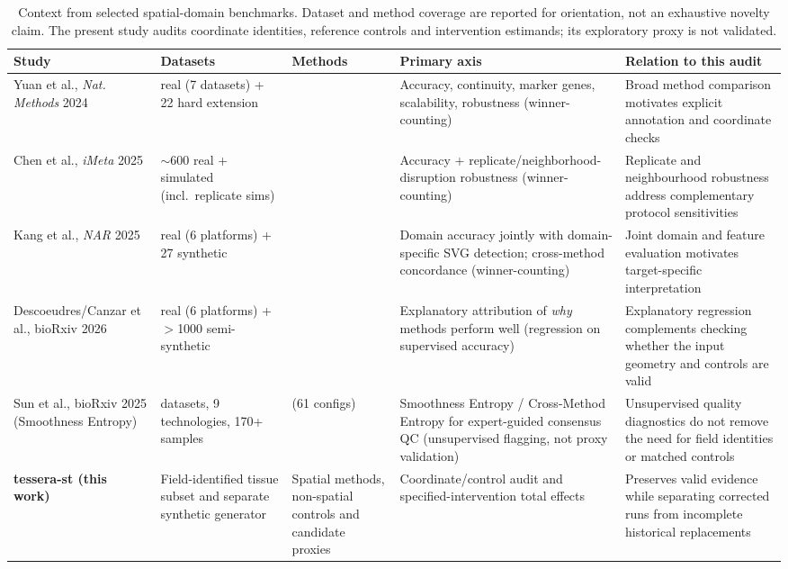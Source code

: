 \documentclass[journal]{IEEEtran}
\begin{document}
\begin{table}[!t]
\centering
\caption{Context from selected spatial-domain benchmarks. Dataset and method coverage are reported for orientation, not an exhaustive novelty claim. The present study audits coordinate identities, reference controls and intervention estimands; its exploratory proxy is not validated.}

\small
\begin{tabular}{@{}>{\raggedright\arraybackslash}p{2.6cm}>{\raggedright\arraybackslash}p{2.7cm}>{\raggedright\arraybackslash}p{2.5cm}>{\raggedright\arraybackslash}p{3.9cm}>{\raggedright\arraybackslash}p{3.3cm}@{}}
\toprule
Study & Datasets & Methods & Primary axis & Relation to this audit \\
\midrule
Yuan et al., \textit{Nat. Methods} 2024 \citep{yuan2024benchmark} &
34 real (7 datasets) + 22 hard extension &
13 &
Accuracy, continuity, marker genes, scalability, robustness (winner-counting) &
Broad method comparison motivates explicit annotation and coordinate checks \\
\addlinespace
Chen et al., \textit{iMeta} 2025 \citep{chen2025imeta} &
$\sim$600 real + simulated (incl.\ replicate sims) &
14 &
Accuracy + replicate/neighborhood-disruption robustness (winner-counting) &
Replicate and neighbourhood robustness address complementary protocol sensitivities \\
\addlinespace
Kang et al., \textit{NAR} 2025 \citep{kang2025nar} &
30 real (6 platforms) + 27 synthetic &
19 &
Domain accuracy jointly with domain-specific SVG detection; cross-method concordance (winner-counting) &
Joint domain and feature evaluation motivates target-specific interpretation \\
\addlinespace
Descoeudres/Canzar et al., bioRxiv 2026 \citep{canzar2026biorxiv} &
63 real (6 platforms) + $>$1000 semi-synthetic &
26 &
Explanatory attribution of \emph{why} methods perform well (regression on supervised accuracy) &
Explanatory regression complements checking whether the input geometry and controls are valid \\
\addlinespace
Sun et al., bioRxiv 2025 \citep{sun2025smoothness} (Smoothness Entropy) &
15 datasets, 9 technologies, 170+ samples &
22 (61 configs) &
Smoothness Entropy / Cross-Method Entropy for expert-guided consensus QC (unsupervised flagging, not proxy validation) &
Unsupervised quality diagnostics do not remove the need for field identities or matched controls \\
\midrule
\textbf{tessera-st (this work)} &
Field-identified tissue subset and separate synthetic generator &
Spatial methods, non-spatial controls and candidate proxies &
Coordinate/control audit and specified-intervention total effects &
Preserves valid evidence while separating corrected runs from incomplete historical replacements \\
\bottomrule
\end{tabular}
\end{table}
\end{document}
